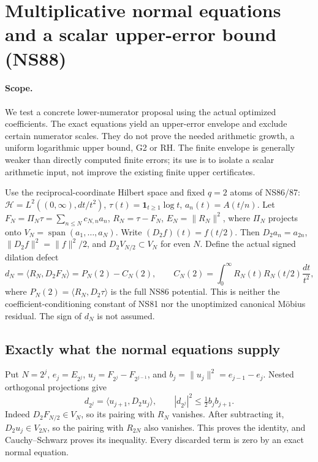 \section{Multiplicative normal equations and a scalar upper-error bound (NS88)}
\paragraph{Scope.}
We test a concrete lower-numerator proposal using the actual optimized
coefficients. The exact equations yield an upper-error envelope and exclude
certain numerator scales. They do not prove the needed arithmetic growth,
a uniform logarithmic upper bound, G2 or RH. The finite envelope is generally
weaker than directly computed finite errors; its use is to isolate a scalar
arithmetic input, not improve the existing finite upper certificates.

Use the reciprocal-coordinate Hilbert space and fixed $q=2$ atoms of NS86/87:
$\mathcal H=L^2((0,\infty),dt/t^2)$,
$\tau(t)=\boldsymbol1_{t\ge1}\log t$, $a_n(t)=A(t/n)$.
Let $F_N=\Pi_N\tau=\sum_{n\le N}c_{N,n}a_n$, $R_N=\tau-F_N$,
$E_N=\|R_N\|^2$, where $\Pi_N$ projects onto $V_N=\operatorname{span}(a_1,\ldots,a_N)$.
Write $(D_2f)(t)=f(t/2)$. Then $D_2a_n=a_{2n}$,
$\|D_2f\|^2=\|f\|^2/2$, and $D_2V_{N/2}\subset V_N$ for even $N$.
Define the actual signed dilation defect
\begin{equation}
 d_N=\langle R_N,D_2F_N\rangle
     =P_N(2)-C_N(2),\qquad
 C_N(2)=\int_0^\infty R_N(t)R_N(t/2)\frac{dt}{t^2},
 \label{eq:ns88-defect}
\end{equation}
where $P_N(2)=\langle R_N,D_2\tau\rangle$ is the full NS86 potential.
This is neither the coefficient-conditioning constant of NS81 nor the
unoptimized canonical M\"obius residual. The sign of $d_N$ is not assumed.

\subsection{Exactly what the normal equations supply}
Put $N=2^j$, $e_j=E_{2^j}$, $u_j=F_{2^j}-F_{2^{j-1}}$, and
$b_j=\|u_j\|^2=e_{j-1}-e_j$. Nested orthogonal projections give
\begin{equation}
 d_{2^j}=\langle u_{j+1},D_2u_j\rangle,\qquad
 |d_{2^j}|^2\le\tfrac12b_jb_{j+1}.
 \label{eq:ns88-two-increments}
\end{equation}
Indeed $D_2F_{N/2}\in V_N$, so its pairing with $R_N$ vanishes.
After subtracting it, $D_2u_j\in V_{2N}$, so the pairing with
$R_{2N}$ also vanishes. This proves the identity, and Cauchy--Schwarz
proves its inequality. Every discarded term is zero by an exact normal equation.

